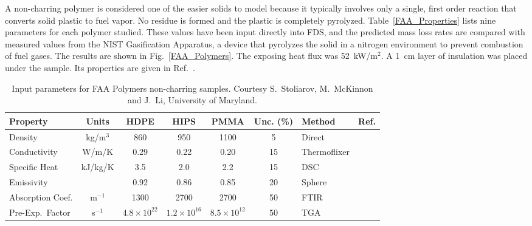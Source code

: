 A non-charring polymer is considered one of the easier solids to model because it typically involves only a single, first order reaction that converts solid plastic to fuel vapor.
No residue is formed and the plastic is completely pyrolyzed. Table~\ref{FAA_Properties}
lists nine parameters for each polymer studied. These values have been input directly into FDS, and the predicted mass loss rates are compared with measured values from the NIST
Gasification Apparatus, a device that pyrolyzes the solid in a nitrogen environment to prevent combustion of fuel gases. The results are shown in Fig.~\ref{FAA_Polymers}. The exposing
heat flux was 52~kW/m$^2$. A 1~cm layer of insulation was placed under the sample. Its properties are given in Ref.~\cite{Stoliarov:CF2009}.


\begin{table}[h!]
\caption[FAA non-charring polymer properties.]{Input parameters for FAA Polymers non-charring samples. Courtesy S.~Stoliarov, M.~McKinnon and J.~Li, University of Maryland.}
\begin{center}
\begin{tabular}{|l|c|c|c|c|c|l|l|}
\hline
Property                    & Units         & HDPE                  & HIPS                  & PMMA                  & Unc. (\%)  & Method                &  Ref.                    \\ \hline \hline
Density                     & kg/m$^3$      & 860                   & 950                   & 1100                   & 5     & Direct                &  \cite{Stoliarov:CF2009}  \\ \hline
Conductivity                & W/m/K         & 0.29                  & 0.22                  & 0.20                 & 15    & Thermoflixer          &  \cite{Stoliarov:CF2009}  \\ \hline
Specific Heat               & kJ/kg/K       & 3.5                   & 2.0                   & 2.2                    & 15    & DSC                   &  \cite{Stoliarov:PDS2008}  \\ \hline
Emissivity                  &               & 0.92                  & 0.86                  & 0.85                  & 20    & Sphere                &  \cite{Hallman:PES1974}  \\ \hline
Absorption Coef.            & m$^{-1}$      & 1300                  & 2700                  & 2700                  & 50    & FTIR                  &  \cite{Tsilingiris:ECM2003}  \\ \hline
Pre-Exp.~Factor             & s$^{-1}$      & $4.8 \times 10^{22}$  & $1.2 \times 10^{16}$  & $8.5 \times 10^{12}$    & 50    & TGA                   &  \cite{Stoliarov:CF2009}  \\ \hline

\end{tabular}
\end{center}
\end{table}
